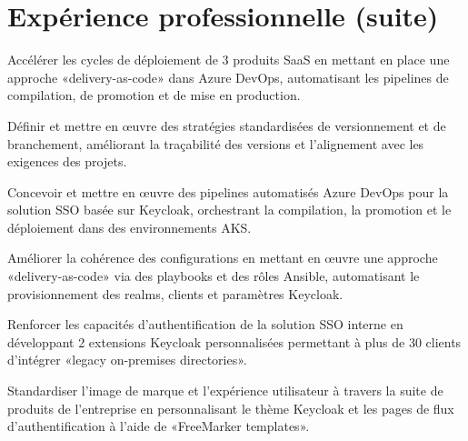 \documentclass[11pt]{deedy-resume-openfont}
\begin{document}
\newpage
\section{Expérience professionnelle (suite)}
\sectionsepsmall
{}\hfill {}
\begin{tightemize}
\item Accélérer les cycles de déploiement de 3 produits SaaS en mettant en place une approche «delivery-as-code» dans Azure DevOps, automatisant les pipelines de compilation, de promotion et de mise en production.
\item Définir et mettre en œuvre des stratégies standardisées de versionnement et de branchement, améliorant la traçabilité des versions et l'alignement avec les exigences des projets.
\end{tightemize}
\sectionsep
{}
\sectionsep
{}\hfill {}
\begin{tightemize}
\item Concevoir et mettre en œuvre des pipelines automatisés Azure DevOps pour la solution SSO basée sur Keycloak, orchestrant la compilation, la promotion et le déploiement dans des environnements AKS.
\item Améliorer la cohérence des configurations en mettant en œuvre une approche «delivery-as-code» via des playbooks et des rôles Ansible, automatisant le provisionnement des realms, clients et paramètres Keycloak.
\item Renforcer les capacités d'authentification de la solution SSO interne en développant 2 extensions Keycloak personnalisées permettant à plus de 30 clients d'intégrer «legacy on-premises directories».
\item Standardiser l'image de marque et l'expérience utilisateur à travers la suite de produits de l'entreprise en personnalisant le thème Keycloak et les pages de flux d'authentification à l'aide de «FreeMarker templates».
\end{tightemize}
\sectionsep
{}

\vspace{0.5cm}
\end{document}
